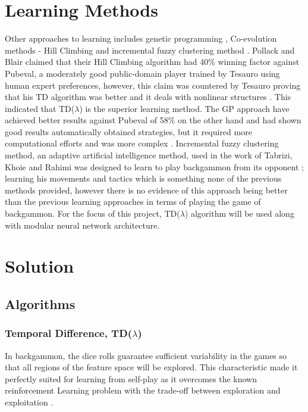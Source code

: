 \documentclass[12pt,a4paper]{article}
\begin{document}
\section*{Learning Methods}
Other approaches to learning includes genetic programming \cite{DBLP:journals/gpem/AzariaS05}, Co-evolution methods - Hill Climbing \cite{DBLP:journals/ml/PollackB98} and incremental fuzzy clustering method \cite{DBLP:conf/nafips/TabriziKR15}. Pollack and Blair claimed that their Hill Climbing algorithm had 40\% winning factor against Pubeval, a moderately good public-domain player trained by Tesauro using human expert preferences, however, this claim was countered by Tesauro proving that his TD algorithm was better and it deals with nonlinear structures \cite{DBLP:journals/ml/Tesauro98}. This indicated that TD($\lambda$) is the superior learning method. The GP approach have achieved better results against Pubeval of 58\% on the other hand and had shown good results automatically obtained strategies, but it required more computational efforts and was more complex \cite{DBLP:journals/gpem/AzariaS05}. Incremental fuzzy clustering method, an adaptive artificial intelligence method, used in the work of Tabrizi, Khoie and Rahimi was designed to learn to play backgammon from its opponent \cite{DBLP:conf/nafips/TabriziKR15}; learning his movements and tactics which is something none of the previous methods provided, however there is no evidence of this approach being better than the previous learning approaches in terms of playing the game of backgammon. For the focus of this project, TD($\lambda$) algorithm will be used along with modular neural network architecture.

\section{Solution}
\subsection{Algorithms}
\subsubsection{Temporal Difference, TD($\lambda$)}
In backgammon, the dice rolls guarantee sufficient variability in the games so that all regions of the feature space will be explored. This characteristic made it perfectly suited for learning from self-play as it overcomes the known reinforcement Learning problem with the trade-off between exploration and exploitation \cite{survey}. 
\end{document}
